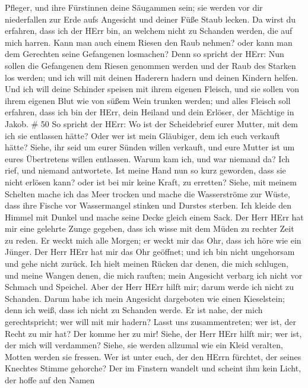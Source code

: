 Pfleger, und ihre Fürstinnen deine Säugammen sein; sie werden vor dir
niederfallen zur Erde aufs Angesicht und deiner Füße Staub lecken. Da
wirst du erfahren, dass ich der HErr bin, an welchem nicht zu Schanden
werden, die auf mich harren.  Kann man auch einem Riesen
den Raub nehmen? oder kann man dem Gerechten seine Gefangenen losmachen?
 Denn so spricht der HErr: Nun sollen die Gefangenen dem
Riesen genommen werden und der Raub des Starken los werden; und ich will
mit deinen Haderern hadern und deinen Kindern helfen.  Und
ich will deine Schinder speisen mit ihrem eigenen Fleisch, und sie
sollen von ihrem eigenen Blut wie von süßem Wein trunken werden; und
alles Fleisch soll erfahren, dass ich bin der HErr, dein Heiland und
dein Erlöser, der Mächtige in Jakob. \# 50  So spricht der
HErr: Wo ist der Scheidebrief eurer Mutter, mit dem ich sie entlassen
hätte? Oder wer ist mein Gläubiger, dem ich euch verkauft hätte? Siehe,
ihr seid um eurer Sünden willen verkauft, und eure Mutter ist um eures
Übertretens willen entlassen.  Warum kam ich, und war
niemand da? Ich rief, und niemand antwortete. Ist meine Hand nun so kurz
geworden, dass sie nicht erlösen kann? oder ist bei mir keine Kraft, zu
erretten? Siehe, mit meinem Schelten mache ich das Meer trocken und
mache die Wasserströme zur Wüste, dass ihre Fische vor Wassermangel
stinken und Durstes sterben.  Ich kleide den Himmel mit
Dunkel und mache seine Decke gleich einem Sack.  Der Herr
HErr hat mir eine gelehrte Zunge gegeben, dass ich wisse mit dem Müden
zu rechter Zeit zu reden. Er weckt mich alle Morgen; er weckt mir das
Ohr, dass ich höre wie ein Jünger.  Der Herr HErr hat mir
das Ohr geöffnet; und ich bin nicht ungehorsam und gehe nicht zurück.
 Ich hielt meinen Rücken dar denen, die mich schlugen, und
meine Wangen denen, die mich rauften; mein Angesicht verbarg ich nicht
vor Schmach und Speichel.  Aber der Herr HErr hilft mir;
darum werde ich nicht zu Schanden. Darum habe ich mein Angesicht
dargeboten wie einen Kieselstein; denn ich weiß, dass ich nicht zu
Schanden werde.  Er ist nahe, der mich gerechtspricht; wer
will mit mir hadern? Lasst uns zusammentreten; wer ist, der Recht zu mir
hat? Der komme her zu mir!  Siehe, der Herr HErr hilft mir;
wer ist, der mich will verdammen? Siehe, sie werden allzumal wie ein
Kleid veralten, Motten werden sie fressen.  Wer ist unter
euch, der den HErrn fürchtet, der seines Knechtes Stimme gehorche? Der
im Finstern wandelt und scheint ihm kein Licht, der hoffe auf den Namen
